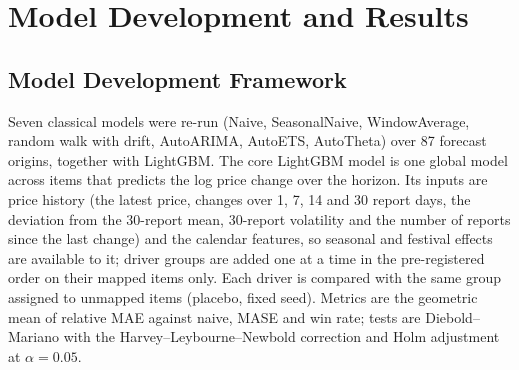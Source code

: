 \documentclass[12pt]{report}
\begin{document}
\chapter{Model Development and Results}

\section{Model Development Framework}
Seven classical models were re-run (Naive, SeasonalNaive, WindowAverage, random walk with drift, AutoARIMA, AutoETS, AutoTheta) over 87 forecast origins, together with LightGBM. The core LightGBM model is one global model across items that predicts the log price change over the horizon. Its inputs are price history (the latest price, changes over 1, 7, 14 and 30 report days, the deviation from the 30-report mean, 30-report volatility and the number of reports since the last change) and the calendar features, so seasonal and festival effects are available to it; driver groups are added one at a time in the pre-registered order on their mapped items only. Each driver is compared with the same group assigned to unmapped items (placebo, fixed seed). Metrics are the geometric mean of relative MAE against naive, MASE and win rate; tests are Diebold--Mariano with the Harvey--Leybourne--Newbold correction and Holm adjustment at $\alpha=0.05$.
\end{document}
